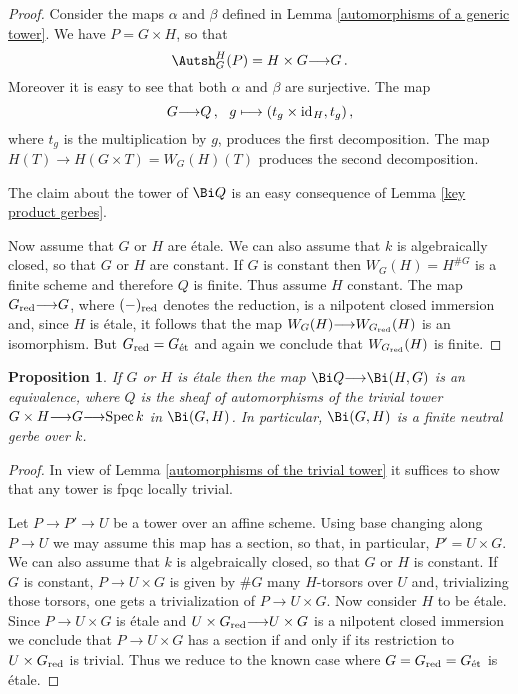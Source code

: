 \documentclass[12pt,reqno]{amsart}
\theoremstyle{plain}
\newtheorem{prop}[thm]{Proposition}
\theoremstyle{definition}
\numberwithin{thm}{section}
\newcounter{x}\setcounter{x}{1}
\theoremstyle{plain}
\begin{document}
\begin{proof}
Consider the maps $\alpha$ and $\beta$ defined in Lemma
\ref{automorphisms of a generic tower}. We have $P=G\times H$, so that
$$\Autsh^H_G(P)=H\times G {\longrightarrow} G\, .$$ Moreover it is easy to see that
both $\alpha$ and $\beta$ are surjective. The map $$G{\longrightarrow} Q\, ,
\ \  g\longmapsto (t_g \times {{\rm id\hspace{.1ex}}}_H,t_g)\, ,$$ where $t_g$ is the multiplication by
$g$, produces the first decomposition. The map $H(T){\longrightarrow} H(G\times T)=W_G(H)(T)$
produces the second decomposition.

The claim about the tower of $\Bi Q$ is an easy consequence of Lemma \ref{key product 
gerbes}.
 
Now assume that $G$ or $H$ are \'etale. We can also assume that $k$ is 
algebraically closed, so that $G$ or $H$ are constant. If $G$ is constant then 
$W_G(H)=H^{\#G}$ is a finite scheme and therefore $Q$ is finite. Thus assume $H$ 
constant. The map $G_{{\rm red}}{\longrightarrow} G$, where $(-)_{{\rm red}}$ denotes the reduction, is a 
nilpotent closed immersion and, since $H$ is \'etale, it follows that the map 
$W_G(H){\longrightarrow} W_{G_{{\rm red}}}(H)$ is an isomorphism. But $G_{{\rm red}}=G_{\textup{\'et}}$ and again we
conclude that $W_{G_{{\rm red}}}(H)$ is finite.
\end{proof}

\begin{prop}\label{etale case}
If $G$ or $H$ is \'etale then the map $\Bi Q{\longrightarrow} \Bi(H,G)$ is an equivalence, 
where $Q$ is the sheaf of automorphisms of the trivial tower $G\times H{\longrightarrow} G{\longrightarrow} 
{{\rm Spec \,}} k$ in $\Bi(G,H)$. In particular, $\Bi(G,H)$ is a finite neutral gerbe over 
$k$.
\end{prop}

\begin{proof}
In view of Lemma \ref{automorphisms of the trivial tower} it suffices to show 
that any tower is fpqc locally trivial.

Let $P{\longrightarrow} P'{\longrightarrow} U$ be a tower over an 
affine scheme. Using base changing along $P{\longrightarrow} U$ we
may assume this map has a section, 
so that, in particular, $P'=U\times G$. We can also assume that $k$ is 
algebraically closed, so that $G$ or $H$ is constant. If $G$ is constant, $P{\longrightarrow} 
U\times G$ is given by $\#G$ many $H$-torsors over $U$ and, trivializing those torsors, 
one gets a trivialization of $P{\longrightarrow} U\times G$. Now consider $H$ to be \'etale. Since 
$P{\longrightarrow} U\times G$ is \'etale and $U\times G_{{\rm red}} {\longrightarrow} U\times G$ is a nilpotent 
closed immersion we conclude that $P{\longrightarrow} U\times G$ has a section if and only if its 
restriction to $U\times G_{{\rm red}}$ is trivial. Thus we reduce to the known case 
where $G=G_{{\rm red}}=G_{\textup{\'et}}$ is \'etale.
\end{proof}
\end{document}

